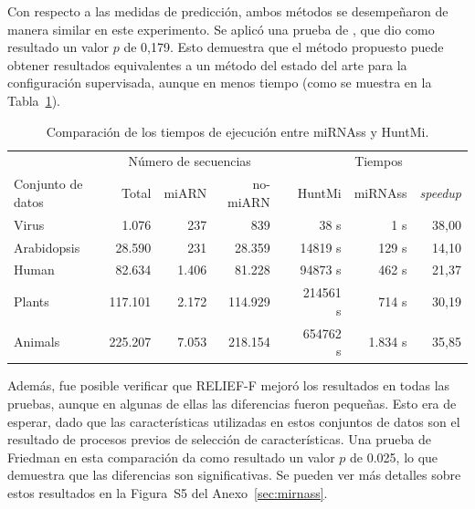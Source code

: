 Con respecto a las medidas de predicción, ambos métodos se desempeñaron de manera similar en este experimento. Se aplicó una prueba de \cite{friedman1937use},
que dio como resultado un valor $ p $ de 0,179. Esto demuestra que el método propuesto puede obtener resultados equivalentes a un método del estado del arte
para la configuración supervisada, aunque en menos tiempo (como se muestra en la Tabla~\ref{tab:times}).
\begin{table}[t]
	\small
	\centering
	\begin{tabular}{@{}lrrrrrrr@{}} \toprule
		&  \multicolumn{3}{c}{Número de secuencias} & & \multicolumn{3}{c}{Tiempos} \\ \cmidrule{2-4} \cmidrule{6-8}
		Conjunto de datos     &   Total  &   miARN   &  no-miARN& &  HuntMi  & miRNAss & \textit{speedup} \\\midrule
		Virus       &   1.076  &      237  &       839 & &     38 s &     1 s & 38,00    \\
		Arabidopsis &  28.590  &      231  &    28.359 & &  14819 s &   129 s & 14,10    \\
		Human       &  82.634  &    1.406  &    81.228 & &  94873 s &   462 s & 21,37    \\
		Plants      & 117.101  &    2.172  &   114.929 & & 214561 s &   714 s & 30,19    \\
		Animals     & 225.207  &    7.053  &   218.154 & & 654762 s & 1.834 s & 35,85    \\\bottomrule
	\end{tabular}
	\caption[Comparación de tiempos de ejecución]{Comparación de los tiempos de ejecución entre miRNAss y HuntMi.\label{tab:times}}
\end{table}
Además, fue posible verificar que RELIEF-F mejoró los resultados en todas las pruebas, aunque en algunas de ellas las diferencias fueron pequeñas. Esto era de
esperar, dado que las características utilizadas en estos conjuntos de datos son el resultado de procesos previos de selección de características. Una prueba de
Friedman en esta comparación da como resultado un valor $ p $ de 0.025, lo que demuestra que las diferencias son significativas. Se pueden ver más detalles
sobre estos resultados en la Figura~S5 del Anexo~\ref{sec:mirnass}.

